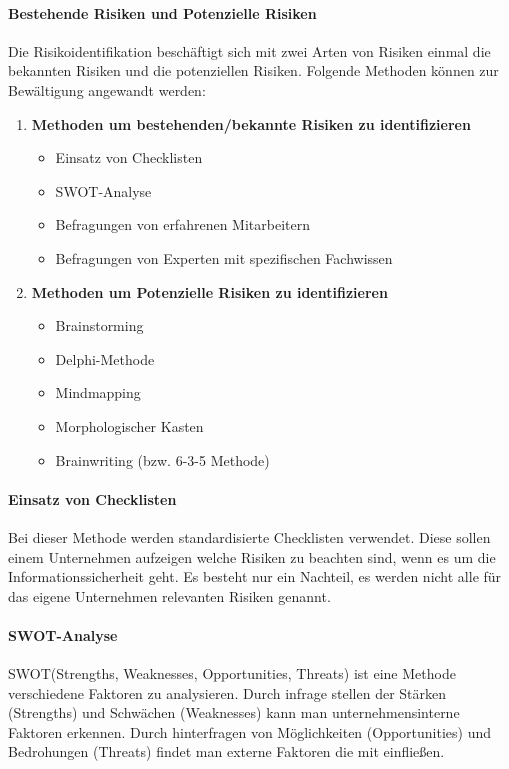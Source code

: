 \paragraph{Bestehende Risiken und Potenzielle Risiken}
Die Risikoidentifikation beschäftigt sich mit zwei Arten von Risiken einmal die bekannten Risiken und die potenziellen Risiken. Folgende Methoden können zur Bewältigung angewandt werden:
\begin{enumerate}
    \item \textbf{Methoden um bestehenden/bekannte Risiken zu identifizieren}
    \begin{itemize}
        \item Einsatz von Checklisten
        \item SWOT-Analyse
        \item Befragungen von erfahrenen Mitarbeitern
        \item Befragungen von Experten mit spezifischen Fachwissen
    \end{itemize}
    \item \textbf{Methoden um Potenzielle Risiken zu identifizieren}
    \begin{itemize}
    	\item Brainstorming
    	\item Delphi-Methode
    	\item Mindmapping
    	\item Morphologischer Kasten
    	\item Brainwriting (bzw. 6-3-5 Methode)
    \end{itemize}
\end{enumerate}

\paragraph{Einsatz von Checklisten}
Bei dieser Methode werden standardisierte Checklisten verwendet. Diese sollen einem Unternehmen aufzeigen welche Risiken zu beachten sind, wenn es um die Informationssicherheit geht. Es besteht nur ein Nachteil, es werden nicht alle für das eigene Unternehmen relevanten Risiken genannt.

\paragraph{SWOT-Analyse}
SWOT(Strengths, Weaknesses, Opportunities, Threats) ist eine Methode verschiedene Faktoren zu analysieren. Durch infrage stellen der Stärken (Strengths) und Schwächen (Weaknesses) kann man unternehmensinterne Faktoren erkennen. Durch hinterfragen von Möglichkeiten (Opportunities) und Bedrohungen (Threats) findet man externe Faktoren die mit einfließen.

